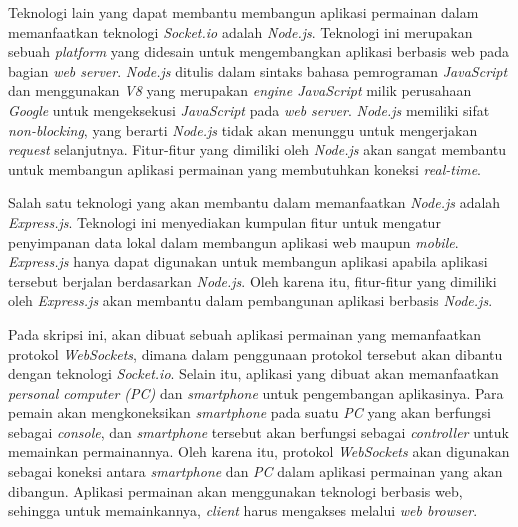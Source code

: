 Teknologi lain yang dapat membantu membangun aplikasi permainan dalam memanfaatkan teknologi \textit{Socket.io} adalah \textit{Node.js}. Teknologi ini merupakan sebuah \textit{platform} yang didesain untuk mengembangkan aplikasi berbasis web pada bagian \textit{web server}. \textit{Node.js} ditulis dalam sintaks bahasa pemrograman \textit{JavaScript} dan menggunakan \textit{V8} yang merupakan \textit{engine JavaScript} milik perusahaan \textit{Google} untuk mengeksekusi \textit{JavaScript} pada \textit{web server}. \textit{Node.js} memiliki sifat \textit{non-blocking}, yang berarti \textit{Node.js} tidak akan menunggu untuk mengerjakan \textit{request} selanjutnya. Fitur-fitur yang dimiliki oleh \textit{Node.js} akan sangat membantu untuk membangun aplikasi permainan yang membutuhkan koneksi \textit{real-time}.

Salah satu teknologi yang akan membantu dalam memanfaatkan \textit{Node.js} adalah \textit{Express.js}. Teknologi ini menyediakan kumpulan fitur untuk mengatur penyimpanan data lokal dalam membangun aplikasi web maupun \textit{mobile}. \textit{Express.js} hanya dapat digunakan untuk membangun aplikasi apabila aplikasi tersebut berjalan berdasarkan \textit{Node.js}. Oleh karena itu, fitur-fitur yang dimiliki oleh \textit{Express.js} akan membantu dalam pembangunan aplikasi berbasis \textit{Node.js}.

Pada skripsi ini, akan dibuat sebuah aplikasi permainan yang memanfaatkan protokol \textit{WebSockets}, dimana dalam penggunaan protokol tersebut akan dibantu dengan teknologi \textit{Socket.io}. Selain itu, aplikasi yang dibuat akan memanfaatkan \textit{personal computer (PC)} dan \textit{smartphone} untuk pengembangan aplikasinya. Para pemain akan mengkoneksikan \textit{smartphone} pada suatu \textit{PC} yang akan berfungsi sebagai \textit{console}, dan \textit{smartphone} tersebut akan berfungsi sebagai \textit{controller} untuk memainkan permainannya. Oleh karena itu, protokol \textit{WebSockets} akan digunakan sebagai koneksi antara \textit{smartphone} dan \textit{PC} dalam aplikasi permainan yang akan dibangun. Aplikasi permainan akan menggunakan teknologi berbasis web, sehingga untuk memainkannya, \textit{client} harus mengakses melalui \textit{web browser}.



